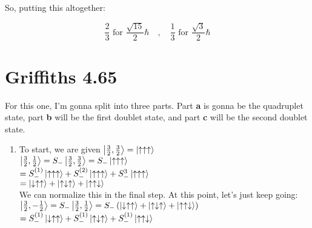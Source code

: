 \documentclass[12pt]{article}
\begin{document}
\begin{enumerate}[label=\alph*)]
So, putting this altogether:

\[\boxed{\frac{2}{3} \text{ for } \frac{\sqrt{15}}{2}\hbar \quad , \quad \frac{1}{3} \text{ for } \frac{\sqrt{3}}{2}\hbar}\]

\end{enumerate}

\newpage

\section*{Griffiths 4.65}
For this one, I'm gonna split into three parts. Part {\bf a} is gonna be the quadruplet state, part {\bf b} will be the first doublet state, and part {\bf c} will be the second doublet state.

\begin{enumerate}[label=\alph*)]
\item To start, we are given $\ket{\frac{3}{2}, \frac{3}{2}} = \ket{\uparrow\uparrow\uparrow}$\vspace{0.5em}\\
$\ket{\frac{3}{2}, \frac{1}{2}} = S_-\ket{\frac{3}{2}, \frac{3}{2}} = S_- \ket{\uparrow\uparrow\uparrow}$\vspace{0.5em}\\
\hspace*{2.7em}$= S_-^{(1)}\ket{\uparrow\uparrow\uparrow} + S_-^{(2)}\ket{\uparrow\uparrow\uparrow} + S_-^{3}\ket{\uparrow\uparrow\uparrow}$\vspace{0.5em}\\
\hspace*{2.7em} $ = \ket{\downarrow\uparrow\uparrow} + \ket{\uparrow\downarrow\uparrow} + \ket{\uparrow\uparrow\downarrow}$\vspace{0.5em}\\
We can normalize this in the final step. At this point, let's just keep going:\vspace{0.5em}\\
$\ket{\frac{3}{2}, -\frac{1}{2}} = S_-\ket{\frac{3}{2}, \frac{1}{2}} = S_-\left(\ket{\downarrow\uparrow\uparrow} + \ket{\uparrow\downarrow\uparrow} + \ket{\uparrow\uparrow\downarrow}\right)$\vspace{0.5em}\\
\hspace*{3.5em}$=S_-^{(1)}\ket{\downarrow\uparrow\uparrow} + S_-^{(1)}\ket{\uparrow\downarrow\uparrow} + S_-^{(1)}\ket{\uparrow\uparrow\downarrow}$\vspace{0.5em}\\

\end{enumerate}
\end{document}
